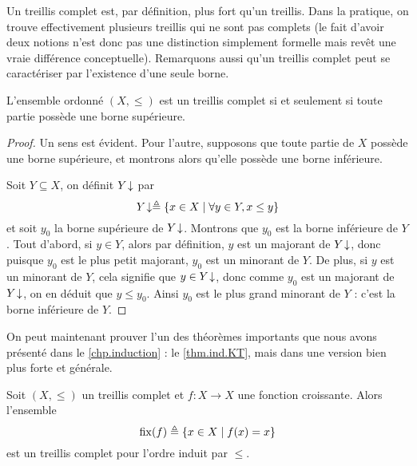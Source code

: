 Un treillis complet est, par définition, plus fort qu'un treillis. Dans la
pratique, on trouve effectivement plusieurs treillis qui ne sont pas complets
(le fait d'avoir deux notions n'est donc pas une distinction simplement formelle
mais revêt une vraie différence conceptuelle). Remarquons aussi qu'un treillis
complet peut se caractériser par l'existence d'une seule borne.

\begin{property}
  L'ensemble ordonné $(X,\leq)$ est un treillis complet si et seulement si toute
  partie possède une borne supérieure.
\end{property}

\begin{proof}
  Un sens est évident. Pour l'autre, supposons que toute partie de $X$ possède
  une borne supérieure, et montrons alors qu'elle possède une borne inférieure.

  Soit $Y\subseteq X$, on définit $Y\!\downarrow$ par
  \[Y\!\downarrow \triangleq \{x\in X \mid \forall y \in Y, x \leq y\}\]
  et soit $y_0$ la borne supérieure de $Y\!\downarrow$. Montrons que $y_0$ est la
  borne inférieure de $Y$. Tout d'abord, si $y\in Y$, alors par définition,
  $y$ est un majorant de $Y\!\downarrow$, donc puisque $y_0$ est le plus petit
  majorant, $y_0$ est un minorant de $Y$. De plus, si $y$ est un minorant
  de $Y$, cela signifie que $y\in Y\!\downarrow$, donc comme $y_0$ est un majorant
  de $Y\!\downarrow$, on en déduit que $y\leq y_0$. Ainsi $y_0$ est le plus grand
  minorant de $Y$ : c'est la borne inférieure de $Y$.
\end{proof}

On peut maintenant prouver l'un des théorèmes importants que nous avons présenté
dans le \cref{chp.induction} : le \cref{thm.ind.KT}, mais dans une version bien
plus forte et générale.

\begin{theorem}
  Soit $(X,\leq)$ un treillis complet et $f : X \to X$ une fonction croissante.
  Alors l'ensemble
  \[\operatorname{fix}(f) \triangleq \{x\in X \mid f(x) = x\}\]
  est un treillis complet pour l'ordre induit par $\leq$.
\end{theorem}

